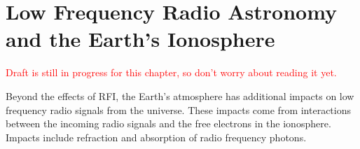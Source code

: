 \chapter{Low Frequency Radio Astronomy and the Earth's Ionosphere}\label{Ch:Iono}

\textcolor{red}{Draft is still in progress for this chapter, so don't worry about reading it yet.}

Beyond the effects of RFI, the Earth's atmosphere has additional impacts on low frequency radio signals from the universe. These impacts come from interactions between the incoming radio signals and the free electrons in the ionosphere. Impacts include refraction and absorption of radio frequency photons. 



